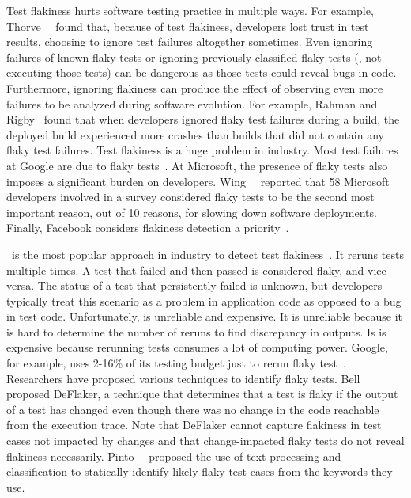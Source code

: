 \documentclass[conference]{IEEEtran}
\begin{document}
Test flakiness hurts software testing practice in multiple ways. For example, Thorve~\etal{}~\cite{thorve2018empirical} found that, because of test flakiness, developers lost trust in test results, choosing to ignore test failures altogether sometimes. Even ignoring failures of known flaky tests or ignoring previously classified flaky tests (\ie{}, not executing those tests) can be dangerous as those tests could reveal bugs in code. Furthermore, ignoring flakiness can produce the effect of observing even more failures to be analyzed during software evolution. For example, Rahman and Rigby~\cite{rahman-rigby-fse2018} found that when developers ignored flaky test failures during a build, the deployed build experienced more crashes than builds that did not contain any flaky test failures. 
Test flakiness is a huge problem in industry. Most test failures at Google are due to flaky tests~\cite{john-mico-google2016,jeff-listfield-google2017}. At Microsoft, the presence of flaky tests also imposes a significant burden on developers. Wing~\etal{}~\cite{wing-etal-issta11} reported that 58 Microsoft developers involved in a survey considered flaky tests to be the second most important reason, out of 10 reasons, for slowing down software deployments. Finally, Facebook considers flakiness detection a priority~\cite{DBLP:conf/scam/HarmanO18}. 

\rerun\ is the most popular approach in industry to detect test flakiness~\cite{john-mico-google2016,flakiness-at-spotify}. 
It reruns tests multiple times. A test that failed and then passed is considered flaky, and vice-versa. The status of a test that persistently failed is unknown, but developers typically treat this scenario as a problem in application code as opposed to a bug in test code. Unfortunately, \rerun{} is unreliable and expensive. It is unreliable because it is hard to determine the number of reruns to find discrepancy in outputs. Is is expensive because rerunning tests consumes a lot of computing power. Google, for example, uses 2-16\% of its testing budget just to rerun flaky test~\cite{john-mico-google2016}. Researchers have proposed various techniques to identify flaky tests. Bell~\etal{}~\cite{bell2018d} proposed DeFlaker, a technique that determines that a test is flaky if the output of a test has changed even though there was no change in the code reachable from the execution trace. Note that DeFlaker cannot capture flakiness in test cases not impacted by changes and that change-impacted flaky tests do not reveal flakiness necessarily. Pinto~\etal~\cite{pinto-etal-msr2020} proposed the use of text processing and classification to statically identify likely flaky test cases from the keywords they use. 
\end{document}
